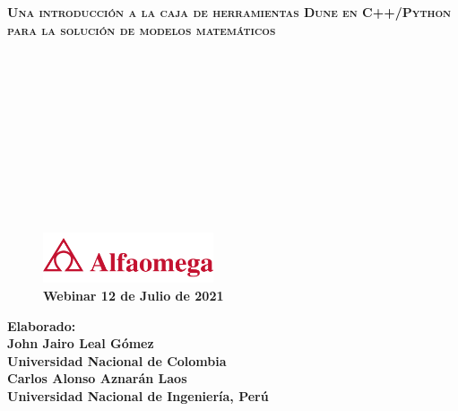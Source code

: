 



{
\begin{frame}

	\color{c++reviewduneblue}

	\begin{flushleft}\bfseries\scshape\huge
		Una introducción a la caja de herramientas Dune en
		C++/Python para la solución de modelos matemáticos
	\end{flushleft}

	\

	\

	\

	\

	\

	\

	\begin{minipage}{0.47\textwidth}
		\begin{figure}[ht!]
			\centering
			\includegraphics[height=1.5cm]{alfaomega}
			\caption*{\large\bfseries\textcolor{c++reviewduneblue}{Webinar 12 de Julio de 2021}}
		\end{figure}
	\end{minipage}
	\begin{minipage}{0.5\textwidth}
		\begin{flushright}\large\bfseries
			Elaborado:\\
			John Jairo Leal Gómez\\
			Universidad Nacional de Colombia\\
			Carlos Alonso Aznarán Laos\\
			Universidad Nacional de Ingeniería, Perú
		\end{flushright}
	\end{minipage}

\end{frame}
}

